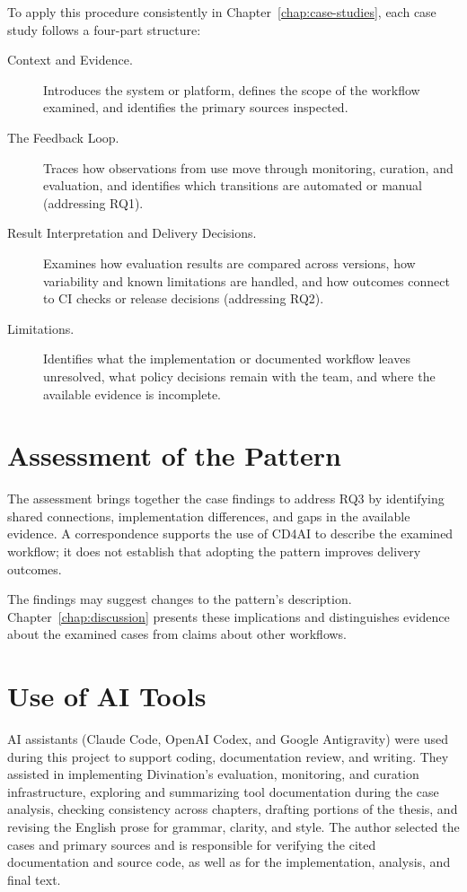 To apply this procedure consistently in Chapter~\ref{chap:case-studies}, each
case study follows a four-part structure:
\begin{description}
  \item[Context and Evidence.] Introduces the system or platform, defines the
    scope of the workflow examined, and identifies the primary sources
    inspected.
  \item[The Feedback Loop.] Traces how observations from use move through
    monitoring, curation, and evaluation, and identifies which transitions are
    automated or manual (addressing RQ1).
  \item[Result Interpretation and Delivery Decisions.] Examines how evaluation
    results are compared across versions, how variability and known limitations
    are handled, and how outcomes connect to CI checks or release decisions
    (addressing RQ2).
  \item[Limitations.] Identifies what the implementation or documented workflow
    leaves unresolved, what policy decisions remain with the team, and where
    the available evidence is incomplete.
\end{description}

\section{Assessment of the Pattern}
\label{sec:method-refinement}

The assessment brings together the case findings to address RQ3 by identifying
shared connections, implementation differences, and gaps in the available
evidence. A correspondence supports the use of CD4AI to describe the examined
workflow; it does not establish that adopting the pattern improves delivery
outcomes.

The findings may suggest changes to the pattern's description.
Chapter~\ref{chap:discussion} presents these implications and distinguishes
evidence about the examined cases from claims about other workflows.

\section{Use of AI Tools}
\label{sec:method-ai}

AI assistants (Claude Code, OpenAI Codex, and Google Antigravity) were used
during this project to support coding, documentation review, and writing. They
assisted in implementing Divination's evaluation, monitoring, and curation
infrastructure, exploring and summarizing tool documentation during the case
analysis, checking consistency across chapters, drafting portions of the
thesis, and revising the English prose for grammar, clarity, and style. The
author selected the cases and primary sources and is responsible for verifying
the cited documentation and source code, as well as for the implementation,
analysis, and final text.
